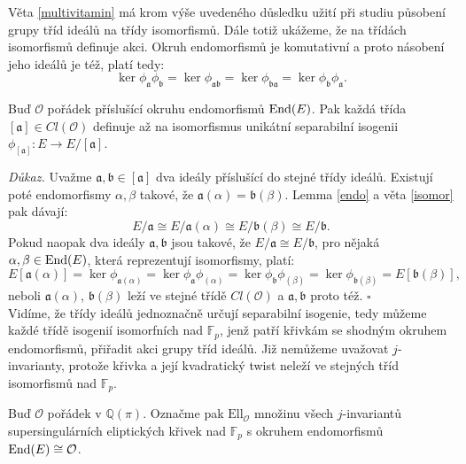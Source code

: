 \documentclass[12pt]{report}
\begin{document}
Věta \ref{multivitamin} má krom výše uvedeného důsledku užití při studiu působení grupy tříd ideálů na třídy isomorfismů. Dále totiž ukážeme, že na třídách isomorfismů definuje akci. Okruh endomorfismů je komutativní a proto násobení jeho ideálů je též, platí tedy:
\begin{equation*}
\ker \phi_{\mathfrak{a}} \phi_{\mathfrak{b}} = \ker \phi_{\mathfrak{ab}} =\ker \phi_{\mathfrak{ba}} = \ker \phi_{\mathfrak{b}} \phi_{\mathfrak{a}}.
\end{equation*}


\begin{veta}\label{idealiso}
Buď $\mathcal{O}$ pořádek příslušící okruhu endomorfismů $\operatorname{End}(E)$. Pak každá třída $[\mathfrak{a}] \in Cl(\mathcal{O})$ definuje až na isomorfismus unikátní separabilní isogenii $\phi_{[\mathfrak{a}]} : E \longrightarrow E/[\mathfrak{a}]$.
\end{veta}
\noindent \textit{Důkaz.} Uvažme $\mathfrak{a},\mathfrak{b} \in [\mathfrak{a}]$ dva ideály příslušící do stejné třídy ideálů. Existují poté endomorfismy $\alpha,\beta$ takové, že $\mathfrak{a}(\alpha) =  \mathfrak{b}(\beta)$. Lemma \ref{endo} a věta \ref{isomor} pak dávají:
\begin{equation*}
E/\mathfrak{a} \cong E/\mathfrak{a}(\alpha)\cong E/\mathfrak{b}(\beta) \cong E/\mathfrak{b}.
\end{equation*}
Pokud naopak dva ideály $\mathfrak{a},\mathfrak{b}$ jsou takové, že $E/\mathfrak{a} \cong E/\mathfrak{b}$, pro nějaká $\alpha,\beta \in \operatorname{End}(E)$, která reprezentují isomorfismy, platí:
\begin{equation*}
E[\mathfrak{a}(\alpha)] = \ker \phi_{\mathfrak{a}(\alpha)} =  \ker \phi_{\mathfrak{a}} \phi_{(\alpha)} = \ker  \phi_{\mathfrak{b}} \phi_{(\beta)} = \ker \phi_{\mathfrak{b} (\beta)} = E[\mathfrak{b}(\beta)],
\end{equation*}
neboli $\mathfrak{a}(\alpha)$, $\mathfrak{b}(\beta)$ leží ve stejné třídě $Cl(\mathcal{O})$ a $\mathfrak{a}, \mathfrak{b}$ proto též.
\hfill $\square$\\

Vidíme, že třídy ideálů jednoznačně určují separabilní isogenie, tedy můžeme každé třídě isogenií isomorfních nad $\mathbb{F}_p$, jenž patří křivkám se shodným okruhem endomorfismů, přiřadit akci grupy tříd ideálů. Již nemůžeme uvažovat $j$-invarianty, protože křivka a její kvadratický twist neleží ve stejných tříd isomorfismů nad $\mathbb{F}_p$.

\begin{definice}
Buď $\mathcal{O}$ pořádek v $\mathbb{Q}(\pi)$. Označme pak $\mathrm{Ell}_{\mathcal{O}}$ množinu všech $j$-invariantů supersingulárních eliptických křivek nad $\mathbb{F}_p$ s okruhem endomorfismů $\operatorname{End}(E) \cong \mathcal{O}$.  
\end{definice}
\end{document}
